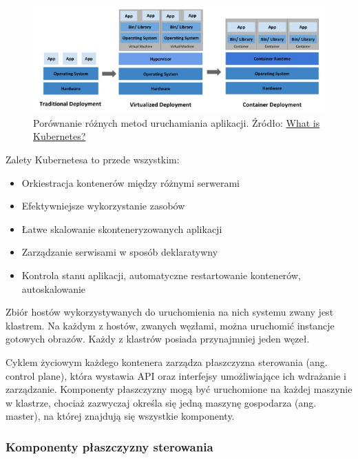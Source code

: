 \documentclass[11pt, a4]{article} %
\begin{document}
\begin{figure}[h]
    \centering
    \includegraphics[width=1\textwidth]{deployment_types.jpg}
    \caption{Porównanie różnych metod uruchamiania aplikacji. Źródło: \href{https://kubernetes.io/docs/concepts/overview/what-is-kubernetes/}{What is Kubernetes?}}
    \label{fig:deployment-types}
\end{figure}

Zalety Kubernetesa to przede wszystkim:

\begin{itemize} %
    \item Orkiestracja kontenerów między różnymi serwerami
    \item Efektywniejsze wykorzystanie zasobów
    \item Łatwe skalowanie skonteneryzowanych aplikacji 
    \item Zarządzanie serwisami w sposób deklaratywny
    \item Kontrola stanu aplikacji, automatyczne restartowanie kontenerów, 
    autoskalowanie
\end{itemize}

Zbiór hostów wykorzystywanych do uruchomienia na nich systemu zwany jest klastrem. Na 
każdym z hostów, zwanych węzłami, można uruchomić instancje gotowych obrazów. Każdy 
z klastrów posiada przynajmniej jeden węzeł.

Cyklem życiowym każdego kontenera zarządza płaszczyzna sterowania (ang. control 
plane), która wystawia API oraz interfejsy umożliwiające ich wdrażanie i zarządzanie. 
Komponenty płaszczyzny mogą być uruchomione na każdej maszynie w klastrze, chociaż 
zazwyczaj określa się jedną maszynę gospodarza (ang. master), na której znajdują się 
wszystkie komponenty.

\subsubsection{Komponenty płaszczyzny sterowania}
\end{document}
